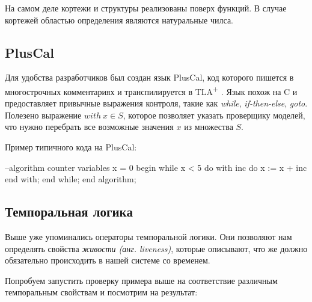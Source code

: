 \documentclass[14pt, openany]{book}
\newcommand{\tlapl}{TLA\textsuperscript{+} }
\begin{document}
На самом деле кортежи и структуры реализованы поверх функций. В случае кортежей областью определения являются натуральные чилса.

\subsection{PlusCal}
Для удобства разработчиков был создан язык PlusCal, код которого пишется в многострочных комментариях и транспилируется в \tlapl. Язык похож на C и предоставляет привычные выражения контроля, такие как \emph{while}, \emph{if-then-else}, \emph{goto}. Полезено выражение \(with~x \in S\), которое позволяет указать проверщику моделей, что нужно перебрать все возможные значения \(x\) из множества \(S\).

Пример типичного кода на PlusCal:
\begin{ppcal}
  --algorithm counter
  variables x = 0
  begin
    while x < 5 do
      with inc  do
        x := x + inc
      end with;
    end while;
  end algorithm; 
\end{ppcal}
\begin{tlatex}
%
%
%
%
%
%
%
%
%
\end{tlatex}

\subsection{Темпоральная логика}
Выше уже упоминались операторы темпоральной логики. Они позволяют нам определять свойства \emph{живости (анг. liveness)}, которые описывают, что же должно обязательно происходить в нашей системе со временем.

Попробуем запустить проверку примера выше на соответствие различным темпоральным свойствам и посмотрим на результат:
\end{document}
